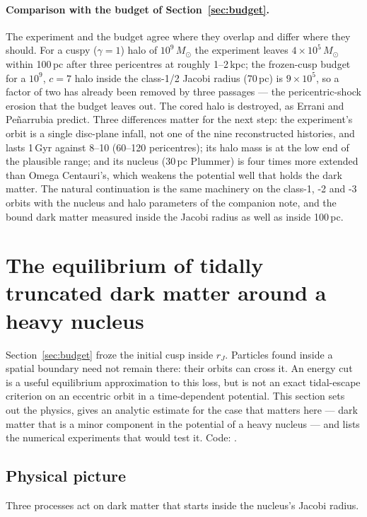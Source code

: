 \documentclass[11pt,a4paper]{article}
\begin{document}
\paragraph{Comparison with the budget of Section~\ref{sec:budget}.} The experiment and the budget agree where they overlap and differ where they should. For a cuspy ($\gamma=1$) halo of $10^{9}\,M_\odot$ the experiment leaves $4\times10^{5}\,M_\odot$ within 100\,pc after three pericentres at roughly 1--2\,kpc; the frozen-cusp budget for a $10^{9}$, $c=7$ halo inside the class-1/2 Jacobi radius (70\,pc) is $9\times10^{5}$, so a factor of two has already been removed by three passages --- the pericentric-shock erosion that the budget leaves out. The cored halo is destroyed, as Errani and Pe\~narrubia predict. Three differences matter for the next step: the experiment's orbit is a single disc-plane infall, not one of the nine reconstructed histories, and lasts 1\,Gyr against 8--10 (60--120 pericentres); its halo mass is at the low end of the plausible range; and its nucleus (30\,pc Plummer) is four times more extended than Omega Centauri's, which weakens the potential well that holds the dark matter. The natural continuation is the same machinery on the class-1, -2 and -3 orbits with the nucleus and halo parameters of the companion note, and the bound dark matter measured inside the Jacobi radius as well as inside 100\,pc.


\section{The equilibrium of tidally truncated dark matter around a heavy nucleus}
\label{sec:equilibrium}

Section~\ref{sec:budget} froze the initial cusp inside $r_J$. Particles found inside a spatial boundary need not remain there: their orbits can cross
it. An energy cut is a useful equilibrium approximation to this loss, but is not an exact
tidal-escape criterion on an eccentric orbit in a time-dependent potential. This section sets out the physics, gives an analytic estimate for the case that matters here --- dark matter that is a minor component in the potential of a heavy nucleus --- and lists the numerical experiments that would test it. Code: .

\subsection{Physical picture}
Three processes act on dark matter that starts inside the nucleus's Jacobi radius.
\end{document}
